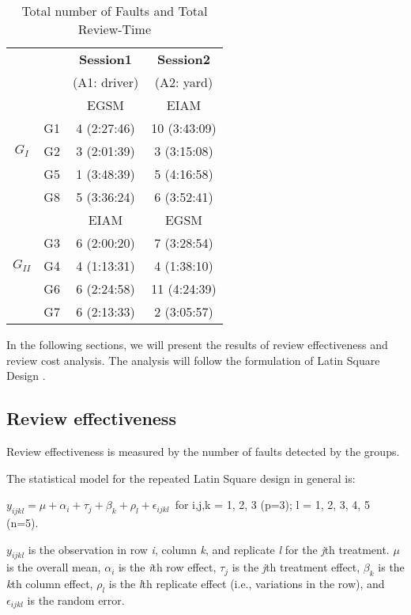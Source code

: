 \begin{table}[h]
  \begin{center}
    \begin{tabular} {|c|c|c|c|}
      \hline
      & & {\bf Session1} & {\bf Session2} \\
      & &  (A1: driver) & (A2: yard) \\
      \hline
      & & EGSM & EIAM \\
      \cline{2-4}  
      & G1 & 4 (2:27:46) & 10 (3:43:09)\\
      \cline{2-4}
 $G_I$ & G2 & 3 (2:01:39) & 3 (3:15:08) \\
      \cline{2-4}
      & G5 & 1 (3:48:39) & 5 (4:16:58) \\
      \cline{2-4}
      & G8 & 5 (3:36:24) & 6 (3:52:41) \\
      \hline
      & & EIAM & EGSM \\
      \cline{2-4}  
      & G3 & 6 (2:00:20) & 7 (3:28:54) \\
      \cline{2-4}
 $G_{II}$ & G4 & 4 (1:13:31) & 4 (1:38:10) \\
      \cline{2-4}
      & G6 & 6 (2:24:58) & 11 (4:24:39) \\
      \cline{2-4}
      & G7 & 6 (2:13:33) & 2 (3:05:57) \\
      \hline
     \end{tabular}
  \end{center}
  \caption{Total number of Faults and Total Review-Time}
  \label{total-faults}
\end{table}

In the following sections, we will present
the results of review effectiveness and review cost analysis.
The analysis will
follow the formulation of Latin Square Design \cite{Montgomery84}.

\subsection{Review effectiveness}

Review effectiveness is measured by the number of faults detected by
the groups. 

The statistical model for the repeated Latin Square design in general
is: 

$y_{ijkl} = \mu + \alpha_i + \tau_j + \beta_k + \rho_l + \epsilon_{ijkl}$\
for i,j,k = 1, 2, 3 (p=3); l = 1, 2, 3, 4, 5 (n=5). 

$y_{ijkl}$ is the observation in row {\sl i}, column {\sl k}, and
replicate {\sl l} for the {\sl j}th treatment.
$\mu$ is the overall mean, $\alpha_i$ is the {\sl i}th
row effect, $\tau_j$ is the {\sl j}th
treatment effect, $\beta_k$ is the
{\sl k}th column effect, $\rho_l$ is the {\sl l}th
replicate effect (i.e., variations in the row), and
$\epsilon_{ijkl}$ is the random error. 


